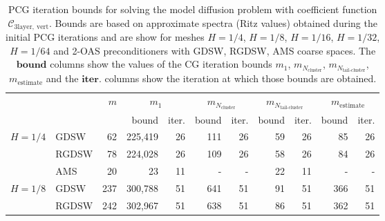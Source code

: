 \begin{table}[H]
\centering
\caption{PCG iteration bounds for solving the model diffusion problem with coefficient function $\mathcal{C}_{\mathrm{3layer, \ vert}}$. Bounds are based on approximate spectra (Ritz values) obtained during the initial PCG iterations and are show for meshes $H=1/4$, $H=1/8$, $H=1/16$, $H=1/32$, $H=1/64$ and 2-OAS preconditioners with GDSW, RGDSW, AMS coarse spaces. The $\textbf{bound}$ columns show the values of the CG iteration bounds $m_1$, $m_{N_{\text{cluster}}}$, $m_{N_{\text{tail-cluster}}}$, $m_{\text{estimate}}$ and the $\textbf{iter.}$ columns show the iteration at which those bounds are obtained.}
\label{tab:cg_iteration_bound_coef=3lvert}
\begin{tabular}{llrrrrrrrrr}
\toprule
 &  & \bfseries $m$ & \multicolumn{2}{|c|}{\bfseries $m_1$} & \multicolumn{2}{|c|}{\bfseries $m_{N_{\text{cluster}}}$} & \multicolumn{2}{|c|}{\bfseries $m_{N_{\text{tail-cluster}}}$} & \multicolumn{2}{|c|}{\bfseries $m_{\text{estimate}}$} \\
 &  &  & bound & iter. & bound & iter. & bound & iter. & bound & iter. \\
\midrule
\multirow[c]{3}{*}{\bfseries $H=1/4$} & GDSW & 62 & {\cellcolor[HTML]{BCE395}} \color[HTML]{000000} 225,419 & 26 & {\cellcolor[HTML]{FFFFE5}} \color[HTML]{000000} 111 & 26 & {\cellcolor[HTML]{379E54}} \color[HTML]{F1F1F1} 59 & 26 & {\cellcolor[HTML]{004529}} \color[HTML]{F1F1F1} 85 & 26 \\
\cline{2-11}
\bfseries  & RGDSW & 78 & {\cellcolor[HTML]{FFFFE5}} \color[HTML]{000000} 224,028 & 26 & {\cellcolor[HTML]{BCE395}} \color[HTML]{000000} 109 & 26 & {\cellcolor[HTML]{379E54}} \color[HTML]{F1F1F1} 58 & 26 & {\cellcolor[HTML]{004529}} \color[HTML]{F1F1F1} 84 & 26 \\
\cline{2-11}
\bfseries  & AMS & 20 & {\cellcolor[HTML]{BCE395}} \color[HTML]{000000} 23 & 11 & {\cellcolor[HTML]{004529}} \color[HTML]{F1F1F1} {\cellcolor[HTML]{ADD8E6}} - & - & {\cellcolor[HTML]{379E54}} \color[HTML]{F1F1F1} 22 & 11 & {\cellcolor[HTML]{FFFFE5}} \color[HTML]{000000} {\cellcolor[HTML]{ADD8E6}} - & - \\
\cline{1-11} \cline{2-11}
\multirow[c]{3}{*}{\bfseries $H=1/8$} & GDSW & 237 & {\cellcolor[HTML]{FFFFE5}} \color[HTML]{000000} 300,788 & 51 & {\cellcolor[HTML]{BCE395}} \color[HTML]{000000} 641 & 51 & {\cellcolor[HTML]{379E54}} \color[HTML]{F1F1F1} 91 & 51 & {\cellcolor[HTML]{004529}} \color[HTML]{F1F1F1} 366 & 51 \\
\cline{2-11}
\bfseries  & RGDSW & 242 & {\cellcolor[HTML]{FFFFE5}} \color[HTML]{000000} 302,967 & 51 & {\cellcolor[HTML]{BCE395}} \color[HTML]{000000} 638 & 51 & {\cellcolor[HTML]{379E54}} \color[HTML]{F1F1F1} 86 & 51 & {\cellcolor[HTML]{004529}} \color[HTML]{F1F1F1} 362 & 51 \\

\end{tabular}
\end{table}
